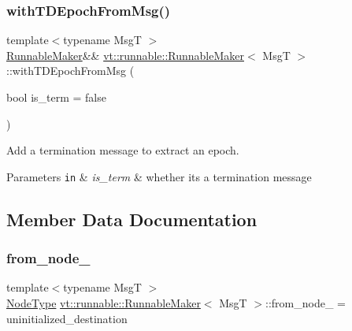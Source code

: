 \subsubsection{\texorpdfstring{with\+T\+D\+Epoch\+From\+Msg()}{withTDEpochFromMsg()}}
{\footnotesize\ttfamily template$<$typename MsgT $>$ \\
\hyperlink{structvt_1_1runnable_1_1_runnable_maker}{Runnable\+Maker}\&\& \hyperlink{structvt_1_1runnable_1_1_runnable_maker}{vt\+::runnable\+::\+Runnable\+Maker}$<$ MsgT $>$\+::with\+T\+D\+Epoch\+From\+Msg (\begin{DoxyParamCaption}\item[{bool}]{is\+\_\+term = {\ttfamily false} }\end{DoxyParamCaption})\hspace{0.3cm}{\ttfamily [inline]}}



Add a termination message to extract an epoch. 


\begin{DoxyParams}[1]{Parameters}
\mbox{\tt in}  & {\em is\+\_\+term} & whether it\textquotesingle{}s a termination message \\
\hline
\end{DoxyParams}


\subsection{Member Data Documentation}
\mbox{\label{structvt_1_1runnable_1_1_runnable_maker_ad053690f0793a709289f3c1d240a2851}} 
\subsubsection{\texorpdfstring{from\+\_\+node\+\_\+}{from\_node\_}}
{\footnotesize\ttfamily template$<$typename MsgT $>$ \\
\hyperlink{namespacevt_a866da9d0efc19c0a1ce79e9e492f47e2}{Node\+Type} \hyperlink{structvt_1_1runnable_1_1_runnable_maker}{vt\+::runnable\+::\+Runnable\+Maker}$<$ MsgT $>$\+::from\+\_\+node\+\_\+ = uninitialized\+\_\+destination\hspace{0.3cm}{\ttfamily [private]}}

